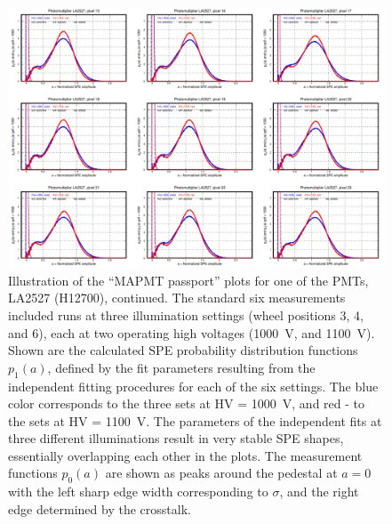 \begin{figure}[!ht]
	\centering
	\includegraphics[width=1.0\textwidth,height=.7\textwidth]{figures/pavel_temp/LA2527_spectra_temp.png}
	\caption{Illustration of the ``MAPMT passport'' plots for one of the PMTs, LA2527 (H12700), continued. The standard six measurements included runs at three illumination settings (wheel positions 3, 4, and 6), each at two operating high voltages (1000~V, and 1100~V). Shown are the calculated SPE probability distribution functions $p_1(a)$, defined by the fit parameters resulting from the independent fitting procedures for each of the six settings. The blue color corresponds to the three sets at HV = 1000~V, and red - to the sets at HV = 1100~V. The parameters of the independent fits at three different illuminations result in very stable SPE shapes, essentially overlapping each other in the plots. The measurement functions $p_0(a)$ are shown as peaks around the pedestal at $a=0$ with the left sharp edge width corresponding to $\sigma$, and the right edge determined by the crosstalk.}
	\label{fig:LA2527_passport_spectra}
\end{figure}

